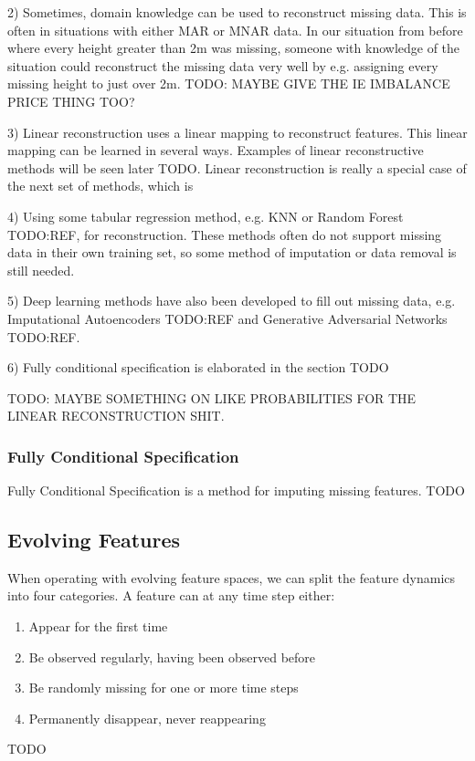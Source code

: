 2) Sometimes, domain knowledge can be used to reconstruct missing data. This is
   often in situations with either MAR or MNAR data. In our situation from
   before where every height greater than 2m was missing, someone with
   knowledge of the situation could reconstruct the missing data very well by
   e.g. assigning every missing height to just over 2m. TODO: MAYBE GIVE THE IE
   IMBALANCE PRICE THING TOO?
    
3) Linear reconstruction uses a linear mapping to reconstruct features. This
   linear mapping can be learned in several ways. Examples of linear
   reconstructive methods will be seen later TODO. Linear reconstruction is
   really a special case of the next set of methods, which is

4) Using some tabular regression method, e.g. KNN or Random Forest TODO:REF,
   for reconstruction. These methods often do not support missing data in their
   own training set, so some method of imputation or data removal is still
   needed.

5) Deep learning methods have also been developed to fill out missing data,
   e.g. Imputational Autoencoders TODO:REF and Generative Adversarial Networks
   TODO:REF. 

6) Fully conditional specification is elaborated in the section TODO

TODO: MAYBE SOMETHING ON LIKE PROBABILITIES FOR THE LINEAR RECONSTRUCTION SHIT.

\subsubsection{Fully Conditional Specification}
Fully Conditional Specification is a method for imputing missing features.
TODO

\subsection{Evolving Features}

When operating with evolving feature spaces, we can split the feature dynamics
into four categories. A feature can at any time step either:

\begin{enumerate}
  \item Appear for the first time
  \item Be observed regularly, having been observed before
  \item Be randomly missing for one or more time steps
  \item Permanently disappear, never reappearing
\end{enumerate}
TODO


